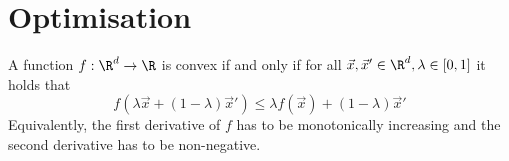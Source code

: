 \section{Optimisation}
A function $f: \R^d \to \R$ is
convex if and only if for all
$\vec{x}, \vec{x}' \in \R^d, \lambda \in [0, 1]$ it
holds that
\begin{equation*}
    f(\lambda \vec{x} + (1- \lambda) \vec{x}')
    \leq
    \lambda f(\vec{x}) + (1 - \lambda) \vec{x}'
\end{equation*}
Equivalently, the first derivative of $f$
has to be monotonically increasing and the
second derivative has to be non-negative.
